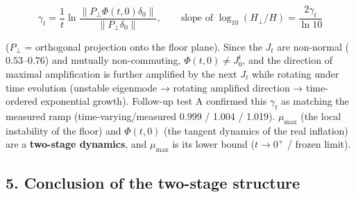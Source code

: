 \documentclass[
  a4paper,
]{ltjsarticle}
\begin{document}
\[\gamma_t=\frac1t\ln\frac{\|P_\perp\Phi(t,0)\delta_0\|}{\|P_\perp\delta_0\|},\qquad \text{slope of }\log_{10}(H_\perp/H)=\frac{2\gamma_t}{\ln10}\]

(\(P_\perp\) = orthogonal projection onto the floor plane). Since the
\(J_t\) are non-normal (\(0.53\)--\(0.76\)) and mutually non-commuting,
\(\Phi(t,0)\neq J_0^t\), and the direction of maximal amplification is
further amplified by the next \(J_t\) while rotating under time
evolution (unstable eigenmode → rotating amplified direction →
time-ordered exponential growth). Follow-up test A confirmed this
\(\gamma_t\) as matching the measured ramp (time-varying/measured 0.999
/ 1.004 / 1.019). \(\mu_{\max}\) (the local instability of the floor)
and \(\Phi(t,0)\) (the tangent dynamics of the real inflation) are a
\textbf{two-stage dynamics}, and \(\mu_{\max}\) is its lower bound
(\(t\to0^+\) / frozen limit).

\subsection{5. Conclusion of the two-stage
structure}\label{conclusion-of-the-two-stage-structure}
\end{document}

